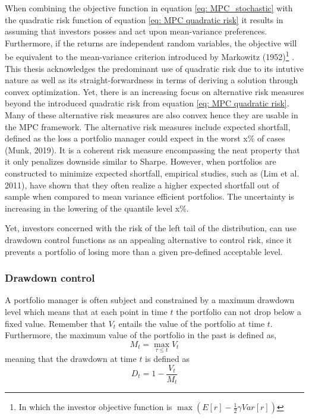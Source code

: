 When combining the objective function in equation \ref{eq: MPC_stochastic} with the quadratic risk function of equation \ref{eq: MPC quadratic risk} it results in assuming that investors posses and act upon mean-variance preferences. Furthermore, if the returns are independent random variables, the objective will be equivalent to the mean-variance criterion introduced by Markowitz (1952)\footnote{
In which the investor objective function is $\max \left(E[r] - \frac{1}{2}\gamma Var[r] \right)$}
. This thesis acknowledges the predominant use of quadratic risk due to its intutive nature as well as its straight-forwardness in terms of deriving a solution through convex optimization. Yet, there is an increasing focus on alternative risk measures beyond the introduced quadratic risk from equation \ref{eq: MPC quadratic risk}. Many of these alternative risk measures are also convex hence they are usable in the MPC framework. The alternative risk measures include expected shortfall, defined as the loss a portfolio manager could expect in the worst x\% of cases (Munk, 2019). It is a coherent risk measure encompassing the neat property that it only penalizes downside similar to Sharpe. However, when portfolios are constructed to minimize expected shortfall, empirical studies, such as (Lim et al. 2011), have shown that they often realize a higher expected shortfall out of sample when compared to mean variance efficient portfolios. The uncertainty is increasing in the lowering of the quantile level x\%. 

Yet, investors concerned with the risk of the left tail of the distribution, can use drawdown control functions as an appealing alternative to control risk, since it prevents a portfolio of losing more than a given pre-defined acceptable level. 

\subsubsection{Drawdown control}
A portfolio manager is often subject and constrained by a maximum drawdown level which means that at each point in time $t$ the portfolio can not drop below a fixed value. Remember that $V_t$ entails the value of the portfolio at time $t$. Furthermore, the maximum value of the portfolio in the past is defined as,
\begin{equation}
    M_t = \max_{\tau \leq t} V_t
\end{equation}
meaning that the drawdown at time $t$ is defined as 
\begin{equation}
    D_t = 1 - \frac{V_t}{M_t}
\end{equation}

